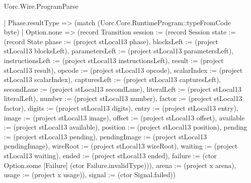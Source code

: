 \begin{lexlean}{Uorc.Wire.ProgramParse}
\begin{semanticmodule}
{    | Phase.resultType => (match (Uorc.Core.RuntimeProgram::typeFromCode byte)
      | Option.none => (record Transition {session := (record Session {state := (record State {phase := (project stLocal13 phase), blocksLeft := (project stLocal13 blocksLeft), parametersLeft := (project stLocal13 parametersLeft), instructionsLeft := (project stLocal13 instructionsLeft), result := (project stLocal13 result), opcode := (project stLocal13 opcode), scalarIndex := (project stLocal13 scalarIndex), capturesLeft := (project stLocal13 capturesLeft), secondLane := (project stLocal13 secondLane), literalLeft := (project stLocal13 literalLeft), number := (project stLocal13 number), factor := (project stLocal13 factor), digits := (project stLocal13 digits), entry := (project stLocal13 entry), image := (project stLocal13 image), offset := (project stLocal13 offset), available := (project stLocal13 available), position := (project stLocal13 position), pending := (project stLocal13 pending), pendingImage := (project stLocal13 pendingImage), wireRoot := (project stLocal13 wireRoot), waiting := (project stLocal13 waiting), ended := (project stLocal13 ended), failure := (ctor Option.some [Failure] (ctor Failure.invalidType))}), arena := (project x arena), usage := (project x usage)}), signal := (ctor Signal.failed)})
}
\end{semanticmodule}
\end{lexlean}
